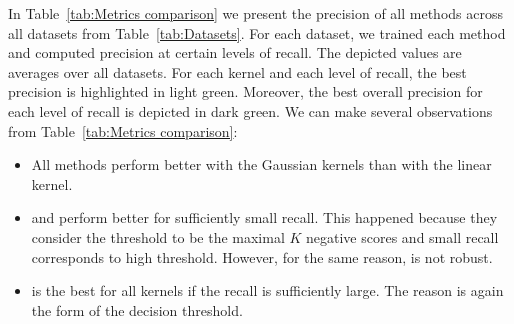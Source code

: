 In Table~\ref{tab:Metrics comparison} we present the precision of all methods across all datasets from Table~\ref{tab:Datasets}. For each dataset, we trained each method and computed precision at certain levels of recall. The depicted values are averages over all datasets. For each kernel and each level of recall, the best precision is highlighted in light green. Moreover, the best overall precision for each level of recall is depicted in dark green. We can make several observations from Table~\ref{tab:Metrics comparison}:
\begin{itemize}
  \item All methods perform better with the Gaussian kernels than with the linear kernel. 
  \item \TopPush and \TopPushK perform better for sufficiently small recall. This happened because they consider the threshold to be the maximal $K$ negative scores and small recall corresponds to high threshold. However, for the same reason, \TopPush is not robust.
  \item \PatMat is the best for all kernels if the recall is sufficiently large. The reason is again the form of the decision threshold.
\end{itemize}

